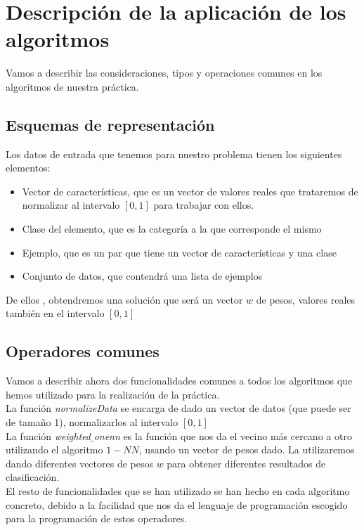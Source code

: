 \documentclass[11pt]{article}
\begin{document}
\section{Descripción de la aplicación de los algoritmos}
Vamos a describir las consideraciones, tipos y operaciones comunes en los algoritmos de nuestra práctica.

\subsection{Esquemas de representación}
Los datos de entrada que tenemos para nuestro problema tienen los siguientes elementos:
\begin{itemize}
	\item Vector de características, que es un vector de valores reales que trataremos de normalizar al intervalo $[0,1]$ para trabajar con ellos.
	\item Clase del elemento, que es la categoría a la que corresponde el mismo
	\item Ejemplo, que es un par que tiene un vector de características y una clase
	\item Conjunto de datos, que contendrá una lista de ejemplos

\end{itemize}
De ellos , obtendremos una solución que será un vector $w$ de pesos, valores reales también en el intervalo $[0,1]$

\subsection{Operadores comunes}
Vamos a describir ahora dos funcionalidades comunes a todos los algoritmos que hemos utilizado para la realización de la práctica.\\

La función \emph{normalizeData} se encarga de dado un vector de datos (que puede ser de tamaño 1), normalizarlos al intervalo $[0,1]$\\

La función \emph{weighted$\_$onenn} es la función que nos da el vecino más cercano a otro utilizando el algoritmo $1-NN$, usando un vector de pesos dado. La utilizaremos dando diferentes vectores de pesos $w$ para obtener diferentes resultados de clasificación.\\

El resto de funcionalidades que se han utilizado se han hecho en cada algoritmo concreto, debido a la facilidad que nos da el lenguaje de programación escogido para la programación de estos operadores.
\end{document}
